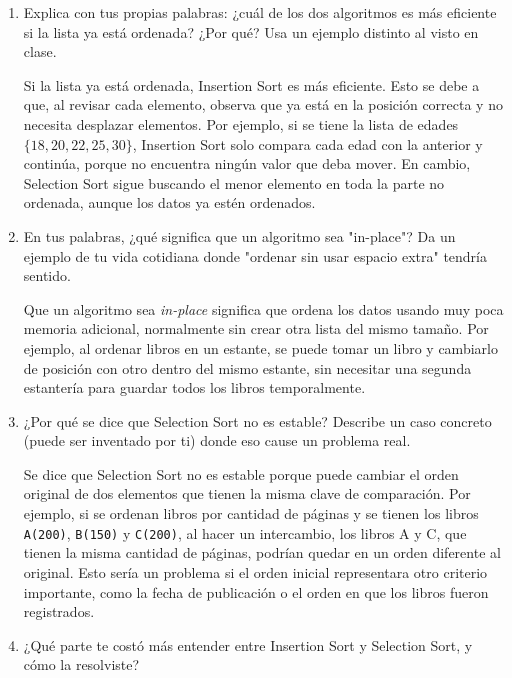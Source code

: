 \documentclass{article}
\begin{document}
		\begin{enumerate}

			\item Explica con tus propias palabras: ¿cuál de los dos algoritmos es más eficiente si la lista ya está ordenada? ¿Por qué? Usa un ejemplo distinto al visto en clase.
			
			Si la lista ya está ordenada, Insertion Sort es más eficiente. Esto se debe
			a que, al revisar cada elemento, observa que ya está en la posición correcta y no
			necesita desplazar elementos. Por ejemplo, si se tiene la lista de edades $\{18,
			20, 22, 25, 30\}$, Insertion Sort solo compara cada edad con la anterior y
			continúa, porque no encuentra ningún valor que deba mover. En cambio, Selection
			Sort sigue buscando el menor elemento en toda la parte no ordenada, aunque los
			datos ya estén ordenados.

			\item En tus palabras, ¿qué significa que un algoritmo sea "in-place"? Da un
	ejemplo de tu vida cotidiana donde "ordenar sin usar espacio extra" tendría
	sentido.

			Que un algoritmo sea \textit{in-place} significa que ordena los datos usando
			muy poca memoria adicional, normalmente sin crear otra lista del mismo tamaño. Por
			ejemplo, al ordenar libros en un estante, se puede tomar un libro y cambiarlo de
			posición con otro dentro del mismo estante, sin necesitar una segunda estantería
			para guardar todos los libros temporalmente.

			\item ¿Por qué se dice que Selection Sort no es estable? Describe un caso concreto
	(puede ser inventado por ti) donde eso cause un problema real.
			
			Se dice que Selection Sort no es estable porque puede cambiar el orden
			original de dos elementos que tienen la misma clave de comparación. Por ejemplo,
			si se ordenan libros por cantidad de páginas y se tienen los libros
			\texttt{A(200)}, \texttt{B(150)} y \texttt{C(200)}, al hacer un intercambio, los
			libros A y C, que tienen la misma cantidad de páginas, podrían quedar en un orden
			diferente al original. Esto sería un problema si el orden inicial representara
			otro criterio importante, como la fecha de publicación o el orden en que los
			libros fueron registrados.

			\item ¿Qué parte te costó más entender entre Insertion Sort y Selection Sort, y cómo
	la resolviste?
			

\end{enumerate}
\end{document}
